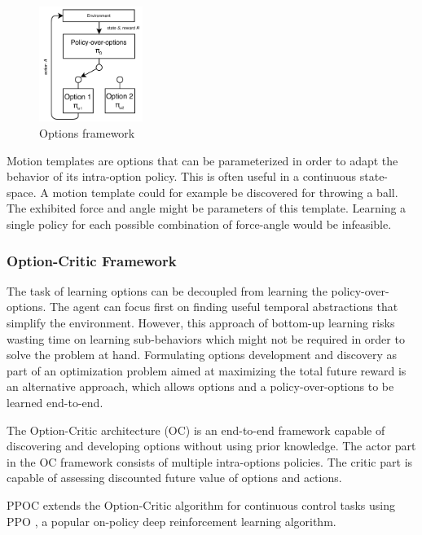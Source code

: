 \begin{figure}[b]
    \centering
    \includegraphics[width=0.3\textwidth]{Images/options_framework.png}
    \caption{Options framework}
    \label{fig:options_framework}
\end{figure}

Motion templates \cite{motion_templates} are options that can be parameterized in order to adapt the behavior of its intra-option policy.
This is often useful in a continuous state-space. A motion template could for example be discovered for throwing a ball. The exhibited
force and angle might be parameters of this template. Learning a single policy for each possible combination of force-angle would be infeasible.

\subsubsection{Option-Critic Framework}

The task of learning options can be decoupled from learning the policy-over-options. The agent can focus first on finding useful temporal
abstractions that simplify the environment. However, this approach of bottom-up learning risks wasting time on learning sub-behaviors which might not be required
in order to solve the problem at hand. Formulating options development and discovery as part of an optimization problem aimed at maximizing the
total future reward is an alternative approach, which allows options and a policy-over-options to be learned end-to-end.

The Option-Critic architecture (OC) \cite{option-critic} is an end-to-end framework capable of discovering and developing options without
using prior knowledge. The actor part in the OC framework consists of multiple intra-options policies. The critic part is capable of assessing discounted
future value of options and actions.

PPOC \cite{PPOC} extends the Option-Critic algorithm for continuous control tasks using PPO \cite{PPO}, a popular on-policy deep reinforcement learning algorithm.

